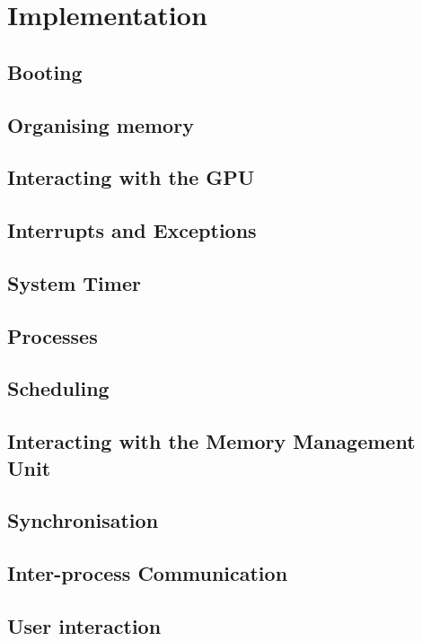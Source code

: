 \section{Implementation}
\subsection{Booting}
\subsection{Organising memory}
\subsection{Interacting with the GPU}
\subsection{Interrupts and Exceptions}
\subsection{System Timer}
\subsection{Processes}
\subsection{Scheduling}
\subsection{Interacting with the Memory Management Unit}
\subsection{Synchronisation}
\subsection{Inter-process Communication}
\subsection{User interaction}
